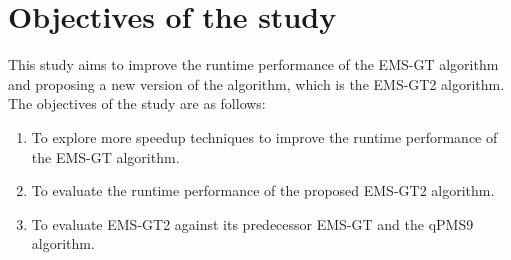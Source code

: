 \section{Objectives of the study}

This study aims to improve the runtime performance of the EMS-GT algorithm and proposing a new version of the algorithm, which is the EMS-GT2 algorithm. The objectives of the study are as follows:

\begin{enumerate}
	\item To explore more speedup techniques to improve the runtime performance of the EMS-GT algorithm.

	\item To evaluate the runtime performance of the proposed EMS-GT2 algorithm.

	\item To evaluate EMS-GT2 against its predecessor EMS-GT and the qPMS9 algorithm.
\end{enumerate}